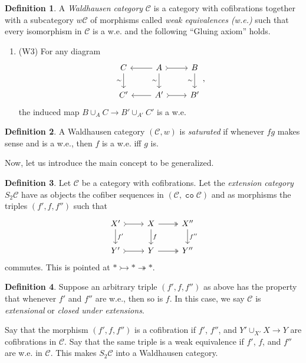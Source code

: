 \documentclass[10pt,letterpaper,cm]{nupset}
\theoremstyle{definition}
\newtheorem{definition}{Definition}
\theoremstyle{theorem}
\theoremstyle{remark}
\newcommand{\1}{\mathbf{1}}
\renewcommand{\c}{\mathscr{C}}
\newcommand{\0}{\vec 0}
\DeclareMathOperator{\co}{\mathtt{co}}
\begin{document}
\begin{definition}
A \textit{Waldhausen category} $\c$ is a category with cofibrations together with a subcategory $w{\c}$ of morphisms called \textit{weak equivalences (w.e.)} such that every isomorphism in $\c$ is a w.e. and the following ``Gluing axiom'' holds.
\begin{enumerate}
\item (W3) For any diagram
\[
\begin{tikzcd}
C \arrow[d, "\sim"'] & A \arrow[d, "\sim"'] \arrow[r, tail] \arrow[l] & B \arrow[d, "\sim"'] \\
C' & A' \arrow[r, tail] \arrow[l] & B'
\end{tikzcd}, \]
the induced map $B \cup_A C \to  B' \cup_{A'} C'$ is a w.e.
\end{enumerate}
\end{definition}

\begin{definition}
A Waldhausen category $(\c, w)$ is \textit{saturated} if whenever $fg$ makes sense and is a w.e., then $f$ is a w.e. iff $g$ is. 
\end{definition}

\smallskip

Now, let us introduce the main concept to be generalized.

\begin{definition}

 Let $\c$ be a category with cofibrations. Let the \textit{extension category} $S_2\c$ have as objects the cofiber sequences in $\left(\c, \co{\c}\right)$ and as morphisms the triples $(f', f, f'')$ such that
\[
\begin{tikzcd}
X' \arrow[r, tail] \arrow[d, "f'"] & X \arrow[r, two heads] \arrow[d, "f"] & X'' \arrow[d, "f''"] \\
Y' \arrow[r, tail] & Y \arrow[r, two heads] & Y''
\end{tikzcd}
\] 
commutes. This is pointed at $\ast \rightarrowtail \ast \twoheadrightarrow \ast$.
\end{definition}

\begin{definition}
Suppose an arbitrary triple $(f', f, f'')$ as above has the property that whenever $f'$ and $f''$ are w.e., then so is $f$. In this case, we say $\c$ is \textit{extensional} or \textit{closed under extensions}.
\end{definition}


Say that the morphism $\left(f', f, f''\right)$ is a cofibration if $f'$, $f''$, and $Y' \cup_{X'} X \to Y$ are cofibrations in $\c$. Say that  the same triple is a weak equivalence if $f'$, $f$, and $f''$ are w.e. in $\c$. This makes $S_2 \c$ into a Waldhausen category.
\end{document}
